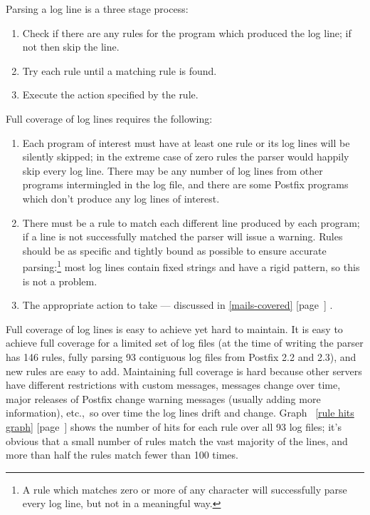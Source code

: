 \documentclass[a4paper,12pt,draft]{article}
\newcommand{\refwithpage}[1]{%
    \empty{}\ref{#1} [page~\pageref{#1}]%
}
\newcommand{\sectionref}[1]{%
    \textsection{}\refwithpage{#1}%
}
\newcommand{\numberOFlogFILES}[0]{%
    93%
}
\newcommand{\numberOFrules}[0]{%
    146%
}
\begin{document}
\label{log-lines-covered}

Parsing a log line is a three stage process:

\begin{enumerate}

    \item Check if there are any rules for the program which produced the
        log line; if not then skip the line.

    \item Try each rule until a matching rule is found.

    \item Execute the action specified by the rule.

\end{enumerate}

Full coverage of log lines requires the following:

\begin{enumerate}

    \item Each program of interest must have at least one rule or its log
        lines will be silently skipped; in the extreme case of zero rules
        the parser would happily skip every log line.  There may be any
        number of log lines from other programs intermingled in the log
        file, and there are some Postfix programs which don't produce any
        log lines of interest.

    \item There must be a rule to match each different line produced by
        each program; if a line is not successfully matched the parser will
        issue a warning.  Rules should be as specific and tightly bound as
        possible to ensure accurate parsing:\footnote{A rule which matches
        zero or more of any character will successfully parse every log
        line, but not in a meaningful way.} most log lines contain fixed
        strings and have a rigid pattern, so this is not a problem.

    \item The appropriate action to take --- discussed in
        \sectionref{mails-covered}.

\end{enumerate}

Full coverage of log lines is easy to achieve yet hard to maintain.  It is
easy to achieve full coverage for a limited set of log files (at the time
of writing the parser has \numberOFrules{} rules, fully parsing
\numberOFlogFILES{} contiguous log files from Postfix 2.2 and 2.3), and new
rules are easy to add.  Maintaining full coverage is hard because other
servers have different restrictions with custom messages, \RBL{} messages
change over time, major releases of Postfix change warning messages
(usually adding more information), etc.,\ so over time the log lines drift
and change.  Graph~\refwithpage{rule hits graph} shows the number of hits
for each rule over all \numberOFlogFILES{} log files; it's obvious that a
small number of rules match the vast majority of the lines, and more than
half the rules match fewer than 100 times.
\end{document}

